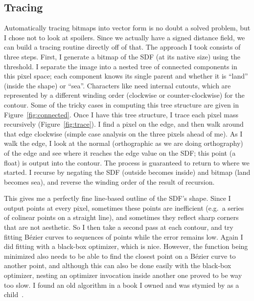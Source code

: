 \documentclass[twocolumn]{article}
\begin{document}
\subsection{Tracing}
Automatically tracing bitmaps into vector form is no doubt a solved
problem, but I chose not to look at spoilers. Since we actually have a
signed distance field, we can build a tracing routine directly off of
that. The approach I took consists of three steps. First, I generate a
bitmap of the SDF (at its native size) using the threshold. I separate
the image into a nested tree of connected components in this pixel
space; each component knows its single parent and whether it is
``land'' (inside the shape) or ``sea''. Characters like 
need internal cutouts, which are represented by a different winding
order (clockwise or counter-clockwise) for the contour. Some of the
tricky cases in computing this tree structure are given in
Figure~\ref{fig:connected}. Once I have this tree structure, I trace
each pixel mass recursively (Figure~\ref{fig:trace}). I find a pixel
on the edge, and then walk around that edge clockwise (simple case
analysis on the three pixels ahead of me). As I walk the edge, I look
at the normal (orthographic as we are doing orthography) of the edge
and see where it reaches the edge value on the SDF; this point (a
float) is output into the contour. The process is guaranteed to return
to where we started. I recurse by negating the SDF (outside
becomes inside) and bitmap (land becomes sea), and reverse the winding
order of the result of recursion.

This gives me a perfectly fine line-based outline of the SDF's shape.
Since I output points at every pixel, sometimes these points are
inefficient (e.g.~a series of colinear points on a straight line),
and sometimes they reflect sharp corners that are not aesthetic. So
I then take a second pass at each contour, and try fitting B\'ezier
curves to sequences of points while the error remains low. Again I
did fitting with a black-box optimizer, which is nice. However,
the function being minimized also needs to be able to find the
closest point on a B\'ezier curve to another point, and although
this can also be done easily with the black-box optimizer, nesting
an optimizer invocation inside another one proved to be way too slow.
I found an old algorithm in a book I owned and was stymied by as a
child~\cite{glassner1990graphics}.
\end{document}
